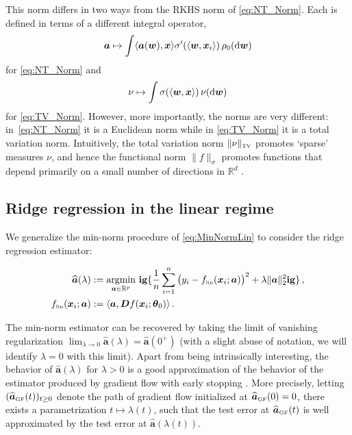 This norm differs in two  ways from the RKHS norm of \eqref{eq:NT_Norm}. Each is  defined in terms of a different integral operator,
  \[
    {\boldsymbol a}\mapsto \int \langle{\boldsymbol a}({\boldsymbol w}),{\boldsymbol x}\rangle\sigma'(\langle{\boldsymbol w},{\boldsymbol x}_i\rangle)\, \rho_0({\rm d}{\boldsymbol w})
  \]
for \eqref{eq:NT_Norm} and
$$\nu\mapsto  \int \sigma(\langle{\boldsymbol w},{\boldsymbol x}\rangle)\, \nu({\rm d}{\boldsymbol w})$$ for
\eqref{eq:TV_Norm}. However, more importantly, the norms are very different: in~\eqref{eq:NT_Norm} it is a Euclidean norm while in
\eqref{eq:TV_Norm} it is a total variation norm. Intuitively, the total variation norm $\|\nu\|_{\mbox{\rm\tiny TV}}$ promotes `sparse' measures $\nu$, and hence the functional norm $\|f\|_{\sigma}$ promotes functions that depend primarily on a small number of directions in ${\mathbb R}^d$ \cite{bach2017breaking}.

\subsection{Ridge regression in the linear regime}
\label{sec:Setup-RF}

We generalize the min-norm procedure of \eqref{eq:MinNormLin} to consider the ridge regression estimator:

\begin{align}
  {\widehat {\boldsymbol a}}(\lambda) &:= \underset{{\boldsymbol a}\in{\mathbb R}^p}{\mathrm{argmin}} \ \mathbf{ig}\{\frac{1}{n}\sum_{i=1}^n\big(y_i-f_{\mbox{\rm\tiny lin}}({\boldsymbol x}_i;{\boldsymbol a})\big)^2+\lambda\|{\boldsymbol a}\|^2_2\mathbf{ig}\}\, ,\label{eq:NT_Ridge}\\
          f_{\mbox{\rm\tiny lin}}({\boldsymbol x}_i;{\boldsymbol a})&:= \langle{\boldsymbol a},{\boldsymbol D} f({\boldsymbol x}_i;{\boldsymbol \theta}_0)\rangle\, .\label{eq:TangentModel}
\end{align}

The min-norm estimator can be recovered by taking the limit of vanishing regularization $\lim_{\lambda\to 0}{\widehat {\boldsymbol a}}(\lambda) = {\widehat {\boldsymbol a}}(0^+)$ (with a slight abuse of notation, we will identify $\lambda=0$ with this limit). Apart from being intrinsically interesting, the behavior of ${\widehat {\boldsymbol a}}(\lambda)$ for $\lambda >0$ is a good approximation of the behavior of the estimator produced by gradient flow with early stopping \cite{ali2019continuous}. More precisely, letting $({\widehat {\boldsymbol a}}_{\mbox{\rm\tiny GF}}(t))_{t\ge 0}$ denote the path of gradient flow initialized at ${\widehat {\boldsymbol a}}_{\mbox{\rm\tiny GF}}(0) =0$, there exists a parametrization $t\mapsto \lambda(t)$, such that the test error at  ${\widehat {\boldsymbol a}}_{\mbox{\rm\tiny GF}}(t)$ is well approximated by the test error at ${\widehat {\boldsymbol a}}(\lambda(t))$.

